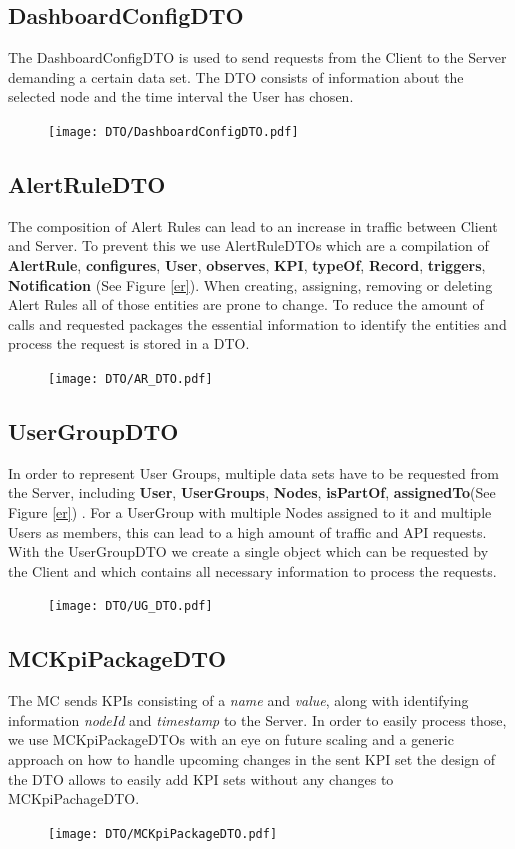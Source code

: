 \documentclass{scrreprt}
\begin{document}
\subsection{DashboardConfigDTO}
The DashboardConfigDTO is used to send requests from the Client to the Server demanding a certain data set. The DTO consists of information about the selected node and the time interval the User has chosen.  
\begin{figure}[H]
	\centering
	\texttt{[image: DTO/DashboardConfigDTO.pdf]}
	\label{dashboardConfigDTO}
\end{figure}
\newpage
\subsection{AlertRuleDTO}
The composition of Alert Rules can lead to an increase in traffic between Client and Server. To prevent this we use AlertRuleDTOs which are a compilation of \textbf{AlertRule}, \textbf{configures}, \textbf{User},  \textbf{observes}, \textbf{KPI}, \textbf{typeOf}, \textbf{Record}, \textbf{triggers}, \textbf{Notification} (See Figure \ref{er}). When creating, assigning, removing or deleting Alert Rules all of those entities are prone to change. To reduce the amount of calls and requested packages the essential information to identify the entities and process the request is stored in a DTO.  
\begin{figure}[H]
	\centering
	\texttt{[image: DTO/AR\_DTO.pdf]}
	\label{alertRuleDTO}
\end{figure}
\newpage
\subsection{UserGroupDTO}
In order to represent User Groups, multiple data sets have to be requested from the Server, including \textbf{User}, \textbf{UserGroups}, \textbf{Nodes}, \textbf{isPartOf}, \textbf{assignedTo}(See Figure \ref{er}) . For a UserGroup with multiple Nodes assigned to it and multiple Users as members, this can lead to a high amount of traffic and API requests. With the UserGroupDTO we create a single object which can be requested by the Client and which contains all necessary information to process the requests.
\begin{figure}[H]
	\centering
	\texttt{[image: DTO/UG\_DTO.pdf]}
	\label{userGroupDTO}
\end{figure}
\subsection{MCKpiPackageDTO}
The MC sends KPIs consisting of a \emph{name} and \emph{value}, along with identifying information \emph{nodeId} and \emph{timestamp} to the Server. In order to easily process those, we use MCKpiPackageDTOs with an eye on future scaling and a generic approach on how to handle upcoming changes in the sent KPI set the design of the DTO allows to easily add KPI sets without any changes to MCKpiPachageDTO. 
\begin{figure}[H]
	\centering
	\texttt{[image: DTO/MCKpiPackageDTO.pdf]}
	\label{trivialDTO}
\end{figure}
\end{document}
